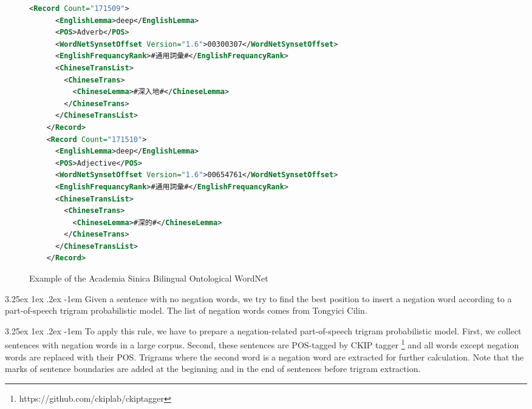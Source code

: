 \documentclass[12pt]{article}
\makeatletter
\newcounter{subsubsubsection}[subsubsection]
\renewcommand\paragraph{\@startsection{paragraph}{5}{\z@}%
  {3.25ex \@plus1ex \@minus.2ex}%
  {-1em}%
  {\normalfont\normalsize\bfseries}}
\makeatother
\begin{document}
\begin{CJK*}{UTF8}{bkai}
\begin{spacing}{1.77}
\begin{figure}
  \centering
  \caption{Example of the Academia Sinica Bilingual Ontological WordNet}
  \begin{minipage}{\linewidth}
    \begin{lstlisting}[language=XML]
    <Record Count="171509">
      <EnglishLemma>deep</EnglishLemma>
      <POS>Adverb</POS>
      <WordNetSynsetOffset Version="1.6">00300307</WordNetSynsetOffset>
      <EnglishFrequancyRank>#通用詞彙#</EnglishFrequancyRank>
      <ChineseTransList>
        <ChineseTrans>
          <ChineseLemma>#深入地#</ChineseLemma>
        </ChineseTrans>
      </ChineseTransList>
    </Record>
    <Record Count="171510">
      <EnglishLemma>deep</EnglishLemma>
      <POS>Adjective</POS>
      <WordNetSynsetOffset Version="1.6">00654761</WordNetSynsetOffset>
      <EnglishFrequancyRank>#通用詞彙#</EnglishFrequancyRank>
      <ChineseTransList>
        <ChineseTrans>
          <ChineseLemma>#深的#</ChineseLemma>
        </ChineseTrans>
      </ChineseTransList>
    </Record>
    \end{lstlisting}
  \end{minipage}
  \label{fig:bow}
\end{figure}

\paragraph{}
Given a sentence with no negation words, we try to find the best position to insert a negation word according to a part-of-speech trigram probabilistic model. The list of negation words comes from
Tongyici Cilin.

\paragraph{}
To apply this rule, we have to prepare a negation-related part-of-speech trigram probabilistic model. First, we collect sentences with negation words in a large corpus. Second, these sentences are POS-tagged by CKIP tagger \footnote{https://github.com/ckiplab/ckiptagger}\cite{Li_Fu_Ma_2020} and all words except negation words are replaced with their POS. Trigrams where the second word is a negation word are extracted for further calculation. Note that the marks of sentence boundaries are added at the beginning and in the end of sentences before trigram extraction.


\end{spacing}
\end{CJK*}
\end{document}
